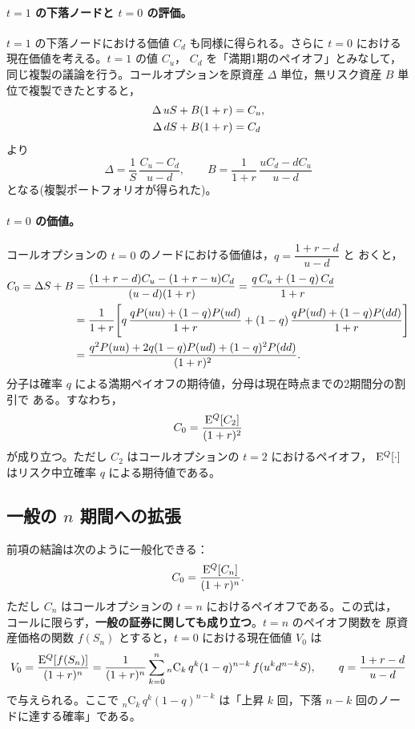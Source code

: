 \paragraph{$t=1$ の下落ノードと $t=0$ の評価。}
$t=1$ の下落ノードにおける価値 $C_d$ も同様に得られる。さらに $t=0$ における
現在価値を考える。$t=1$ の値 $C_u$， $C_d$ を「満期1期のペイオフ」とみなして，
同じ複製の議論を行う。コールオプションを原資産 $\Delta$ 単位，無リスク資産
$B$ 単位で複製できたとすると，
\begin{align}
\Delta\,uS + B(1+r) &= C_u,\notag\\
\Delta\,dS + B(1+r) &= C_d
\end{align}
より
\begin{equation}
\Delta = \frac{1}{S}\,\frac{C_u - C_d}{u-d},\qquad
B = \frac{1}{1+r}\,\frac{uC_d - dC_u}{u-d}
\end{equation}
となる(複製ポートフォリオが得られた)。

\paragraph{$t=0$ の価値。}
コールオプションの $t=0$ のノードにおける価値は，$q = \dfrac{1+r-d}{u-d}$ と
おくと，
\begin{align}
C_0 = \Delta S + B
&= \frac{(1+r-d)C_u - (1+r-u)C_d}{(u-d)(1+r)}
= \frac{q\,C_u + (1-q)\,C_d}{1+r}\notag\\
&= \frac{1}{1+r}\Biggl[
q\,\frac{qP(uu) + (1-q)P(ud)}{1+r}
+ (1-q)\,\frac{qP(ud) + (1-q)P(dd)}{1+r}\Biggr]\notag\\
&= \frac{q^2P(uu) + 2q(1-q)P(ud) + (1-q)^2P(dd)}{(1+r)^2}.
\label{eq:two-period}
\end{align}
分子は確率 $q$ による満期ペイオフの期待値，分母は現在時点までの2期間分の割引で
ある。すなわち，
\begin{equation}
C_0 = \frac{\mathrm{E}^Q[C_2]}{(1+r)^2}
\end{equation}
が成り立つ。ただし $C_2$ はコールオプションの $t=2$ におけるペイオフ，
$\mathrm{E}^Q[\cdot]$ はリスク中立確率 $q$ による期待値である。

\subsection{一般の $n$ 期間への拡張}

前項の結論は次のように一般化できる：
\begin{equation}
C_0 = \frac{\mathrm{E}^Q[C_n]}{(1+r)^n}.
\label{eq:crr-general-call}
\end{equation}
ただし $C_n$ はコールオプションの $t=n$ におけるペイオフである。この式は，
コールに限らず，\textbf{一般の証券に関しても成り立つ}。$t=n$ のペイオフ関数を
原資産価格の関数 $f(S_n)$ とすると，$t=0$ における現在価値 $V_0$ は
\begin{equation}
V_0 = \frac{\mathrm{E}^Q[f(S_n)]}{(1+r)^n}
= \frac{1}{(1+r)^n}\sum_{k=0}^{n}
{}_n\mathrm{C}_k\,q^k(1-q)^{n-k}\,f(u^k d^{n-k}S),
\qquad q = \frac{1+r-d}{u-d}
\label{eq:crr-general}
\end{equation}
で与えられる。ここで ${}_n\mathrm{C}_k\,q^k(1-q)^{n-k}$ は「上昇 $k$ 回，下落
$n-k$ 回のノードに達する確率」である。

